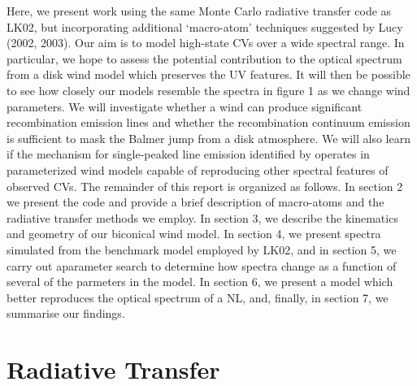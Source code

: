 \documentclass[preprint, a4paper, 11pt]{aastex}
\begin{document}
{Here, we present work using the same Monte Carlo radiative transfer code as LK02, 
but incorporating additional `macro-atom' techniques suggested by Lucy (2002, 2003). 
Our aim is to model high-state CVs over a wide spectral range.
In particular, we hope to assess the potential contribution
to the optical spectrum from a disk wind model which preserves the UV features.
It will then be possible to see how closely
our models resemble the spectra in figure 1 as we change wind parameters.
We will investigate whether a wind can produce significant
recombination emission lines and whether the recombination
continuum emission is sufficient to mask the Balmer jump from a disk atmosphere.
We will also learn if the mechanism for single-peaked line emission
identified by \cite{MC96} operates  in  parameterized wind models capable of reproducing 
other spectral features of observed CVs.  The remainder of this report is organized as follows.
In section 2 we present the code and provide a brief description of macro-atoms 
and the radiative transfer methods we employ.  In section 3, 
we describe the kinematics and geometry of our biconical wind model.
In section 4, we present spectra simulated from the benchmark model employed by LK02, and in section 5, we carry out 
aparameter search to determine how spectra change as a function of several of the parmeters in the model. In section 6, we present a
model which better reproduces the optical spectrum of a NL, and, 
finally, in section 7, we summarise our findings.










%
%

\section{Radiative Transfer}

}
\end{document}
